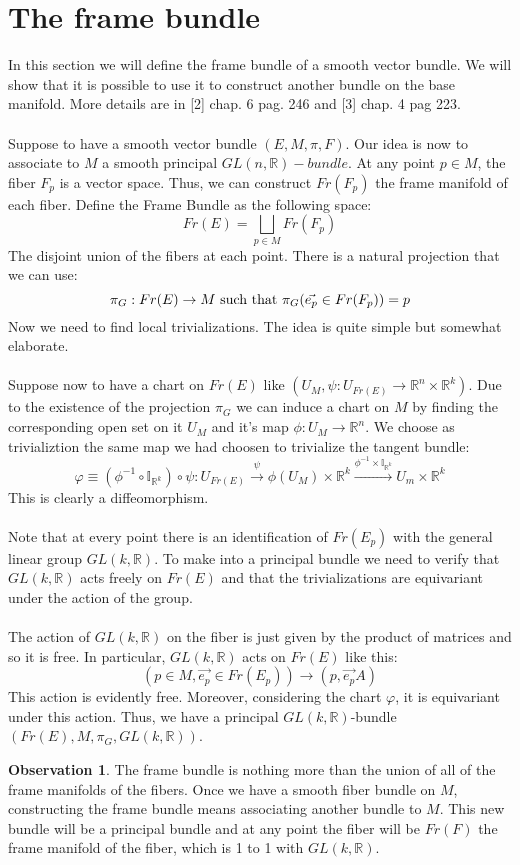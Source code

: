 \documentclass[12pt,a4paper]{report}
\theoremstyle{definition}
\theoremstyle{Theorem}
\theoremstyle{definition}
\theoremstyle{definition}
\newtheorem{Obs}[Def]{Observation}
\begin{document}
		\section{The frame bundle}
		In this section we will define the frame bundle of a smooth vector bundle. We will show that it is possible to use it to construct another bundle on the base manifold. More details are in [2] chap. 6 pag. 246 and [3] chap. 4 pag 223.\\
		\\
		Suppose to have a smooth vector bundle $(E,M,\pi,F)$. Our idea is now to associate to $M$ a smooth principal $GL(n,\mathbb{R})-bundle$. At any point $p\in M$, the fiber $F_p$ is a vector space. Thus, we can construct $Fr(F_p)$ the frame manifold of each fiber. Define the Frame Bundle as the following space:
		$$Fr(E)=\bigsqcup_{p\in M}Fr(F_p)$$
		The disjoint union of the fibers at each point. There is a natural projection that we can use:
		$$\pi_G:Fr(E)\rightarrow M\hbox{ such that } \pi_G(\vec{e_p}\in Fr(F_p))=p$$
		Now we need to find local trivializations. The idea is quite simple but somewhat elaborate.\\
		\\
		Suppose now to have a chart on $Fr(E)$ like $(U_{M},\psi:U_{Fr(E)}\rightarrow \mathbb{R}^n\times\mathbb{R}^k)$. Due to the existence of the projection $\pi_G$ we can induce a chart on $M$ by finding the corresponding open set on it $U_M$ and it's map $\phi:U_M\rightarrow \mathbb{R}^n$. We choose as trivializtion the same map we had choosen to trivialize the tangent bundle:
		$$\varphi\equiv(\phi^{-1}\circ \mathbb{I}_{\mathbb{R}^k})\circ \psi: U_{Fr(E)}\xrightarrow{\psi}\phi(U_M)\times\mathbb{R}^k\xrightarrow{\phi^{-1}\times\mathbb{I}_{\mathbb{R}^k}}U_m\times\mathbb{R}^k$$
		This is clearly a diffeomorphism.\\
		\\
		Note that at every point there is an identification of $Fr(E_p)$ with the general linear group $GL(k,\mathbb{R})$. To make into a principal bundle we need to verify that $GL(k,\mathbb{R})$ acts freely on $Fr(E)$ and that the trivializations are equivariant under the action of the group.\\
		\\
		The action of $GL(k,\mathbb{R})$ on the fiber is just given by the product of matrices and so it is free. In particular, $GL(k,\mathbb{R})$ acts on $Fr(E)$ like this:
		$$(p\in M,\vec{e_p}\in Fr(E_p))\longrightarrow(p,\vec{e_p}A)$$
		This action is evidently free. Moreover, considering the chart $\varphi$, it is equivariant under this action. Thus, we have a principal $GL(k,\mathbb{R})$-bundle $(Fr(E),M,\pi_G,GL(k,\mathbb{R}))$.
		\begin{Obs}
			The frame bundle is nothing more than the union of all of the frame manifolds of the fibers. Once we have a smooth fiber bundle on $M$, constructing the frame bundle means associating another bundle to $M$. This new bundle will be a principal bundle and at any point the fiber will be $Fr(F)$ the frame manifold of the fiber, which is 1 to 1 with $GL(k,\mathbb{R})$.
		\end{Obs}
\end{document}
